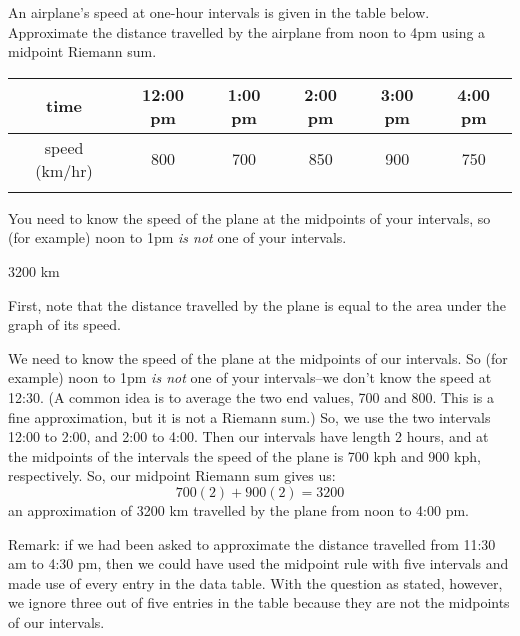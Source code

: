 \begin{question}\label{1.1airtime}
An airplane's speed at one-hour intervals is given in the table below.
Approximate the distance travelled by the airplane from noon to 4pm using a midpoint Riemann sum.
\begin{center}
\renewcommand{\arraystretch}{1.3}
   \begin{tabular}{!{\vrule width 1pt}c!{\vrule width 1pt}c|c|c|c|c!{\vrule width 1pt}}
        time  & 12:00 pm & 1:00 pm & 2:00 pm & 3:00 pm & 4:00 pm   \\
         \hline
        speed (km/hr) & 800 & 700 & 850 &900 & 750 \\
     \end{tabular}
\renewcommand{\arraystretch}{1.0}
\end{center}

\end{question}
\begin{hint}
You need to know the speed of the plane at the midpoints of your intervals, so (for example) noon to 1pm \emph{is not} one of your intervals.
\end{hint}
\begin{answer}
3200 km
\end{answer}
\begin{solution}
First, note that the distance travelled by the plane is equal to the area under the graph of its speed.

We need to know the speed of the plane at the midpoints of our intervals. So (for example) noon to 1pm \emph{is not} one of your intervals--we don't know the speed at 12:30. (A common idea is to average the two end values, 700 and 800. This is a fine approximation, but it is not a Riemann sum.) So, we use the two intervals 12:00 to 2:00, and 2:00 to 4:00. Then our intervals have length 2 hours, and at the midpoints of the intervals the speed of the plane is 700 kph and 900 kph, respectively. So, our midpoint Riemann sum gives us:
\[700(2)+900(2) = 3200\]
an approximation of 3200 km travelled by the plane from noon to 4:00 pm.

Remark: if we had been asked to approximate the distance travelled from 11:30 am to 4:30 pm, then we could have used the midpoint rule with five intervals and made use of every entry in the data table. With the question as stated, however, we ignore three out of five entries in the table because they are not the midpoints of our intervals.
\end{solution}


